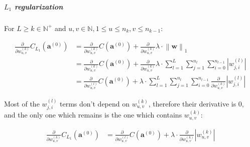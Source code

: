 \documentclass{article}
\begin{document}
          \subparagraph{$L_1$ regularization}

            For $L \geq k \in \mathbb{N}^+$ and
            $u, v \in \mathbb{N}, 1 \leq u \leq n_k, v \leq n_{k - 1}$:

            \begin{equation}
              \begin{split}
                \frac{\partial}{\partial w_{u,v}^{(k)}}
                  C_{L_1} \left( \mathbf{a}^{(0)} \right)
                    & = \frac{\partial}{\partial w_{u,v}^{(k)}}
                          C \left( \mathbf{a}^{(0)} \right)
                        +
                        \frac{\partial}{\partial w_{u,v}^{(k)}}
                          \lambda \cdot \left\| \mathbf{w} \right\|_1 \\
                    & = \frac{\partial}{\partial w_{u,v}^{(k)}}
                          C \left( \mathbf{a}^{(0)} \right)
                        +
                        \frac{\partial}{\partial w_{u,v}^{(k)}}
                          \lambda
                          \cdot
                          \sum_{l=1}^L \sum_{j=1}^{n_l} \sum_{i=0}^{n_{l-1}}
                            \left\lvert w_{j,i}^{(l)} \right\rvert \\
                    & = \frac{\partial}{\partial w_{u,v}^{(l)}}
                          C \left( \mathbf{a}^{(0)} \right)
                        +
                        \lambda
                        \cdot
                        \sum_{l=1}^L \sum_{j=1}^{n_l} \sum_{i=0}^{n_{l-1}}
                          \frac{\partial}{\partial w_{u,v}^{(k)}}
                            \left\lvert w_{j,i}^{(l)} \right\rvert
              \end{split}
            \end{equation}

            Most of the $w_{j,i}^{(l)}$ terms don't depend on $w_{u,v}^{(k)}$,
            therefore their derivative is $0$, and the only one which remains is
            the one which contains $w_{u,v}^{(k)}$:

            \begin{equation}
              \begin{split}
                \frac{\partial}{\partial w_{u,v}^{(k)}}
                  C_{L_1} \left( \mathbf{a}^{(0)} \right)
                    & = \frac{\partial}{\partial w_{u,v}^{(l)}}
                          C \left( \mathbf{a}^{(0)} \right)
                        +
                        \lambda
                        \cdot
                        \frac{\partial}{\partial w_{u,v}^{(k)}}
                          \left\lvert w_{u,v}^{(k)} \right\rvert
              \end{split}
            \end{equation}
\end{document}
